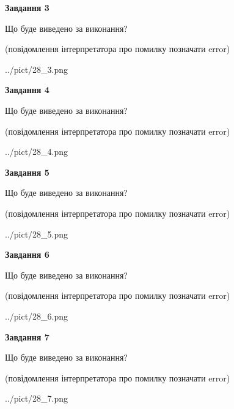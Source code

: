 \documentclass[12pt, ukrainian]{article}
\begin{document}
{\begin {large}
{\begin {center}\textbf{Завдання 3}\end {center}}\par
Що буде виведено за виконання?\par
 (повідомлення інтерпретатора про помилку позначати error)\par
\begin{center}
	{../pict/28_3.png}
\end{center}
\newpage

{\begin {center}\textbf{Завдання 4}\end {center}}\par
Що буде виведено за виконання?\par
 (повідомлення інтерпретатора про помилку позначати error)\par
\begin{center}
	{../pict/28_4.png}
\end{center}
\newpage

{\begin {center}\textbf{Завдання 5}\end {center}}\par
Що буде виведено за виконання?\par
 (повідомлення інтерпретатора про помилку позначати error)\par
\begin{center}
	{../pict/28_5.png}
\end{center}
\newpage

{\begin {center}\textbf{Завдання 6}\end {center}}\par
Що буде виведено за виконання?\par
 (повідомлення інтерпретатора про помилку позначати error)\par
\begin{center}
	{../pict/28_6.png}
\end{center}
\newpage

{\begin {center}\textbf{Завдання 7}\end {center}}\par
Що буде виведено за виконання?\par
 (повідомлення інтерпретатора про помилку позначати error)\par
\begin{center}
	{../pict/28_7.png}
\end{center}
\newpage


\end{large}}
\end{document}
